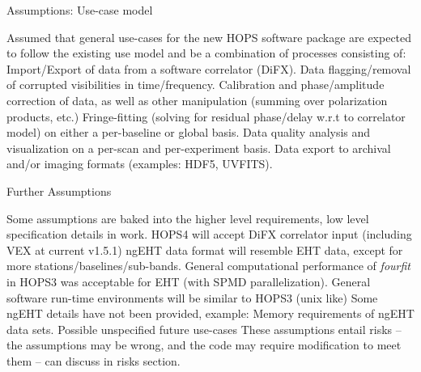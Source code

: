 \documentclass[8pt]{beamer}
\newcommand{\FIX}[1][fixme]{{\color{red}#1}}
\begin{document}
\begin{frame}{Assumptions: Use-case model}

\begin{outline}
  \1 Assumed that general use-cases for the new HOPS software package are expected to follow the existing use model and be a combination of processes consisting of:
  \2 Import/Export of data from a software correlator (DiFX).
  \2 Data flagging/removal of corrupted visibilities in time/frequency.
  \2 Calibration and phase/amplitude correction of data, as well as other manipulation (summing over polarization products, etc.)
  \2 Fringe-fitting (solving for residual phase/delay w.r.t to correlator model) on either a per-baseline or global basis.
  \2 Data quality analysis and visualization on a per-scan and per-experiment basis.
  \2 Data export to archival and/or imaging formats (examples: HDF5, UVFITS).
\end{outline}
    
\end{frame}

\begin{frame}{Further Assumptions}


\begin{outline}
    \1  Some assumptions are baked into the higher level requirements, low level specification details in work.
        \2 HOPS4 will accept DiFX correlator input (including VEX at current v1.5.1) 
        \2 ngEHT data format will resemble EHT data, except for more stations/baselines/sub-bands.
        \2 General computational performance of \textit{fourfit} in HOPS3 was acceptable for EHT (with SPMD parallelization).
        \2 General software run-time environments will be similar to HOPS3 (unix like)
    \1 Some ngEHT details have not been provided, example:
        \2 Memory requirements of ngEHT data sets.
        \2 Possible unspecified future use-cases
    \1 These assumptions entail risks -- the assumptions may be wrong, and the code may require modification to meet them -- can discuss in risks section.
\end{outline}

\end{frame}
\end{document}
